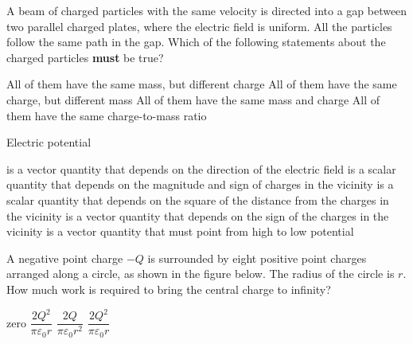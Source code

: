 \documentclass{../../../oss-apphys-exam}
\begin{document}
\begin{questions}
  \question A beam of charged particles with the same velocity is directed
  into a gap between two parallel charged plates, where the electric field
  is uniform. All the particles follow the same path in the gap. Which of
  the following statements about the charged particles \textbf{must} be true?
  \begin{choices}
    \choice All of them have the same mass, but different charge
    \choice All of them have the same charge, but different mass
    \choice All of them have the same mass and charge
    \choice All of them have the same charge-to-mass ratio
  \end{choices}
  \newpage
  
  \question Electric potential
  \begin{choices}
    \choice is a vector quantity that depends on the direction of the electric
    field
    \choice is a scalar quantity that depends on the magnitude and sign of
    charges in the vicinity
    \choice is a scalar quantity that depends on the square of the distance
    from the charges in the vicinity
    \choice is a vector quantity that depends on the sign of the charges in
    the vicinity
    \choice is a vector quantity that must point from high to low potential
  \end{choices}

  \question A negative point charge $-Q$ is surrounded by eight positive
  point charges arranged along a circle, as shown in the figure below. The
  radius of the circle is $r$. How much work is required to bring the central
  charge to infinity?
  \begin{oneparchoices}
    \choice zero
    \choice $\dfrac{2Q^2}{\pi\varepsilon_0r}$
    \choice $\dfrac{2Q}{\pi\varepsilon_0r^2}$
    \choice $\dfrac{2Q^2}{\pi\varepsilon_0r}$
  \end{oneparchoices}
  

\end{questions}
\end{document}
